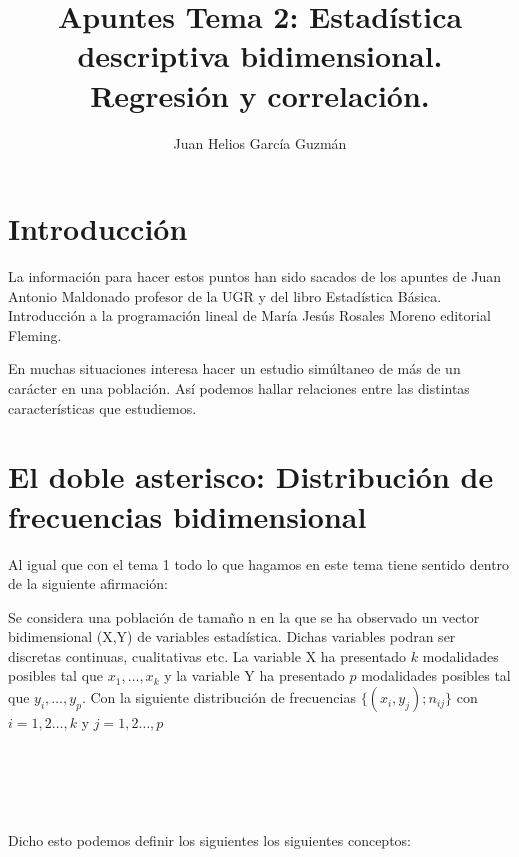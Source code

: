 \documentclass{article}
\theoremstyle{definition}
\begin{document}
\author{Juan Helios García Guzmán}
\large
\title{ %
	Apuntes Tema 2: Estadística descriptiva bidimensional. Regresión y correlación. \\
}
\maketitle

\section{Introducción}

La información para hacer estos puntos han sido sacados
de los apuntes de Juan Antonio Maldonado profesor de la UGR y del libro
Estadística Básica. Introducción a la programación lineal de María Jesús
Rosales Moreno editorial Fleming.

En muchas situaciones interesa hacer un estudio simúltaneo de más de un
carácter en una población. Así podemos hallar relaciones entre las distintas
características que estudiemos.
\section{El doble asterisco: Distribución de frecuencias bidimensional}

Al igual que con el tema 1 todo lo que hagamos en este tema tiene sentido dentro
de la siguiente afirmación:

Se considera una población de tamaño n en la que se ha observado un vector
bidimensional (X,Y) de variables estadística. Dichas variables podran ser
discretas continuas, cualitativas etc. La variable X ha presentado $k$
modalidades posibles tal que $x_1, \ldots, x_k$ y la variable Y ha
presentado $p$ modalidades posibles tal que $y_i, \ldots, y_p$. Con la
siguiente distribución de frecuencias $\{(x_i , y_j); n_{ij}\}$ con
$i=1,2\dots,k$ y $j=1,2\dots,p$  \\ \\ \\ \\ \\ \\

Dicho esto podemos definir los siguientes los siguientes conceptos: \\
\end{document}
